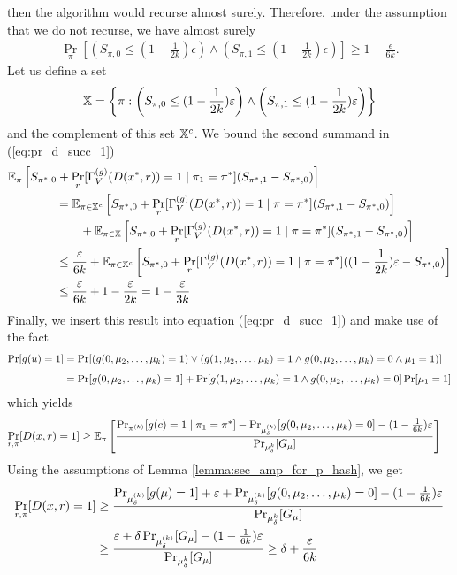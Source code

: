 then the algorithm would recurse almost surely.
Therefore, under the assumption that we do not recurse, we have almost surely
\begin{align}
\underset{\pi}{\Pr}\left[\left(S_{\pi,0} \leq (1 - \frac{1}{2k})\epsilon\right) \land \left( S_{\pi,1} \leq (1-\frac{1}{2k})\epsilon\right)\right] \geq 1 - \frac{\epsilon}{6k}.
\end{align}
Let us define a set
\begin{align}
  \X = \left\{ \pi :  \left(S_{\pi,0} \leq (1 - \frac{1}{2k})\epsilon\right) \land \left( S_{\pi,1} \leq (1-\frac{1}{2k})\epsilon \right) \right\}
\end{align}
and the complement of this set $\X^c$.
We bound the second summand in (\ref{eq:pr_d_succ_1})
\begin{align}
&\mathbb{E}_{\pi}\left[ S_{\pi^*,0} + \Pr_r [\Gamma_V^{(g)}(D(x^*,r)) = 1 \mid \pi_1 = \pi^*](S_{\pi^*,1} - S_{\pi^*,0}) \right] \notag\\
&\IndII = \mathbb{E}_{\pi \in \X^c}\left[ S_{\pi^*,0} + \Pr_r [\Gamma_V^{(g)}(D(x^*,r)) = 1 \mid \pi = \pi^*](S_{\pi^*,1} - S_{\pi^*,0}) \right] \notag\\
&\IndIII +  \mathbb{E}_{\pi \in \X}\left[ S_{\pi^*,0} + \Pr_r [\Gamma_V^{(g)}(D(x^*,r)) = 1 \mid \pi = \pi^*](S_{\pi^*,1} - S_{\pi^*,0}) \right] \\
&\IndII \leq \frac{\epsilon}{6k} + \mathbb{E}_{\pi \in \X^c}\left[ S_{\pi^*,0} + \Pr_r [\Gamma_V^{(g)}(D(x^*,r)) = 1 \mid \pi = \pi^*]((1 - \frac{1}{2k})\epsilon - S_{\pi^*,0}) \right] \\
&\IndII \leq \frac{\epsilon}{6k} + 1 - \frac{\epsilon}{2k} = 1 - \frac{\epsilon}{3k}
\end{align}
Finally, we insert this result into equation (\ref{eq:pr_d_succ_1}) and make use of the fact
\begin{align*}
\underset{}{\Pr}[g(u) = 1] &= \underset{}{\Pr}[(g(0, \mu_2, \dots, \mu_k) = 1) \lor ( g(1,\mu_2, \dots, \mu_k) = 1 \land g(0, \mu_2, \dots, \mu_k) = 0 \land \mu_1 = 1)] \notag\\
&= \Pr[g(0,\mu_2, \dots,\mu_k) = 1] + \Pr[g(1,\mu_2,\dots,\mu_k) = 1 \land g(0, \mu_2, \dots, \mu_k) = 0] \Pr[\mu_1 = 1]
\end{align*}
which yields
\begin{align*}
  \underset{r,\pi}{\Pr}[D(x,r) = 1]
&\geq \mathbb{E}_{\pi}\left[\frac{{\Pr}_{\pi^{(k)}}[g(c) = 1 \mid \pi_1 = \pi^*] -
{\Pr}_{\mu_{\delta}^{(k)}}[g(0, \mu_2, \dots, \mu_k) = 0] - (1 - \frac{1}{6k})\epsilon} {{\Pr}_{\mu_{\delta}^{k}}[G_{\mu}]}\right] \notag
 \end{align*}
 Using the assumptions of Lemma \ref{lemma:sec_amp_for_p_hash}, we get
 \begin{align*}
   \underset{r,\pi}{\Pr}[D(x,r) = 1]
 &\geq \frac{ {\Pr}_{\mu_{\delta}^{(k)}}[g(\mu) = 1] + \epsilon +
 \Pr_{\mu_{\delta}^{(k)}}[g(0, \mu_2, \dots, \mu_k) = 0] - (1 - \frac{1}{6k})\epsilon}
 {\Pr_{\mu_{\delta}^{k}}[G_{\mu}]} \notag\\
 &\geq \frac{\epsilon +
\delta\Pr_{\mu_{\delta}^{(k)}}[G_{\mu}] - (1 - \frac{1}{6k})\epsilon}
{\Pr_{\mu_{\delta}^{k}}[G_{\mu}]} \geq \delta + \frac{\epsilon}{6k}
\end{align*}


